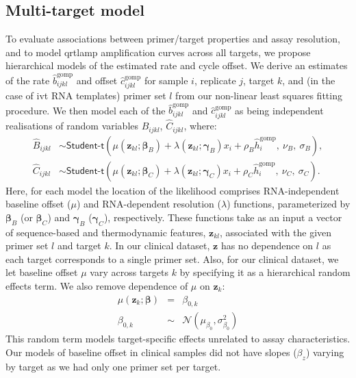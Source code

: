 \documentclass[../thesis.tex]{subfiles}
\begin{document}
\subsection{Multi-target model \label{sec:hierarchicalmodel}}
To evaluate associations between primer/target properties and assay resolution, and to model \gls{qrtlamp} amplification curves across all targets, we propose hierarchical models of the estimated rate and cycle offset. We derive an estimates of the  rate $\hat{b}^{\text{gomp}}_{ijkl}$ and offset $\hat{c}^{\text{gomp}}_{ijkl}$ for sample $i$, replicate $j$, target $k$, and (in the case of \gls{ivt}  RNA templates) primer set $l$ from our non-linear least squares fitting procedure. We then model each of the $\hat{b}^{\text{gomp}}_{ijkl}$ and $\hat{c}^{\text{gomp}}_{ijkl}$ as being independent realisations of random variables $\hat{B}_{ijkl}$, $\hat{C}_{ijkl}$, where: 
\begin{align} 
    \hat{B}_{ijkl}  & \sim  \textsf{Student-t}(\mu(\bm{z}_{kl}; \bm{\beta}_B) + \lambda(\bm{z}_{kl}; \bm{\gamma}_B) x_i + \rho_B \hat{h}^{\text{gomp}}_{i}, \ \nu_B, \ \sigma_B), \label{eq:bhm} \\
    \hat{C}_{ijkl}  & \sim  \textsf{Student-t}(\mu(\bm{z}_{kl}; \bm{\beta}_C) + \lambda(\bm{z}_{kl}; \bm{\gamma}_C) x_i + \rho_C \hat{h}^{\text{gomp}}_{i}, \ \nu_C, \ \sigma_C). \label{eq:chm}
\end{align}
Here, for each model the location of the likelihood comprises RNA-independent baseline offset ($\mu$) and RNA-dependent resolution ($\lambda$) functions, parameterized by $\bm{\beta}_B$ (or $\bm{\beta}_C$) and $\bm{\gamma}_B$ ($\bm{\gamma}_C$), respectively. These functions take as an input a vector of sequence-based and thermodynamic features, $\bm{z}_{kl}$, associated with the given primer set $l$ and target $k$. In our clinical dataset, $\bm{z}$ has no dependence on $l$ as each target corresponds to a single primer set. Also, for our clinical dataset, we let baseline offset $\mu$ vary across targets $k$ by specifying it as a hierarchical random effects term. We also remove dependence of $\mu$ on $\bm{z}_{k}$:
\begin{eqnarray} \label{eq:muclin}
    \mu(\bm{z}_k; \bm{\beta}) &=& \beta_{0,k} \\
    \beta_{0,k} &\sim& \mathcal{N}(\mu_{\beta_{0}},\sigma^{2}_{\beta_{0}})
\end{eqnarray}
This random term models target-specific effects unrelated to assay characteristics. Our models of baseline offset in clinical samples did not have slopes ($\beta_{z}$) varying by target as we had only one primer set per target. 
\end{document}
